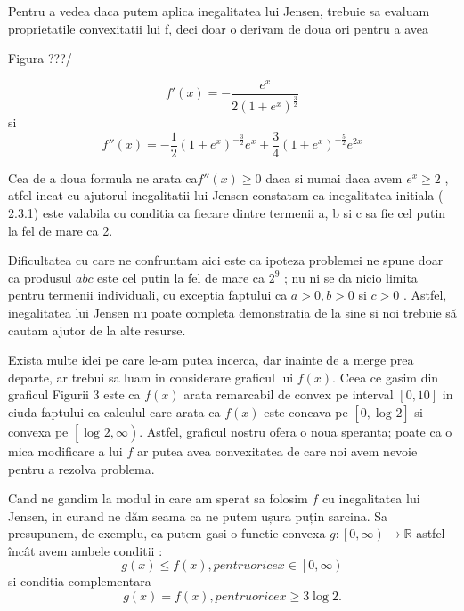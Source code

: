 \documentclass[a4paper,12pt,oneside]{report}
\begin{document}
Pentru a vedea daca putem aplica inegalitatea lui Jensen, trebuie sa evaluam proprietatile convexitatii lui f,  deci doar o derivam de doua ori pentru a avea  

Figura ???/

\begin{displaymath}
  {f}'\left ( x \right ) = -\frac{e^{x}}{2 \left ( 1 + e^{x} \right )^{\frac{3}{2}}}
\end{displaymath}
si
\begin{displaymath}
  {f}''\left ( x \right ) = -\frac{1}{2}\left (  1 + e^{x} \right )^{-\frac{3}{2}}e^{x} + \frac{3}{4}\left ( 1 + e^{x} \right )^{-\frac{5}{2}}e^{2x}
\end{displaymath}

Cea de a doua formula ne arata ca\({f}''\left ( x \right ) \geq 0\) daca si numai daca avem \(e^{x}\geq 2\) , atfel incat cu ajutorul inegalitatii lui Jensen  constatam ca inegalitatea initiala ( 2.3.1) este valabila cu conditia ca fiecare dintre termenii a, b si c sa fie cel putin la fel de mare ca 2. 

Dificultatea cu care ne confruntam aici este ca ipoteza problemei  ne spune doar  ca produsul \(abc\) este cel putin la fel de mare ca \(2^{9}\) ; nu ni se da nicio  limita pentru termenii  individuali, cu exceptia faptului ca \( a > 0, b > 0 \) si \(c > 0\) . Astfel, inegalitatea lui Jensen nu poate completa demonstratia de la sine si noi trebuie să cautam ajutor de la alte resurse. 

Exista multe idei pe care le-am putea incerca, dar inainte de a merge prea departe,  ar trebui sa luam in considerare graficul lui \(f\left ( x \right )\). Ceea ce  gasim  din graficul  Figurii 3 este ca \(f\left ( x \right ) \) arata remarcabil de convex pe interval \(\left [ 0, 10 \right ]  \) in ciuda faptului ca calculul care arata ca \(f\left ( x \right ) \) este concava pe \(\left [ 0, \log _{} 2\right ] \) si convexa pe \(\left [ \log _{} 2 , \infty \right ) \). Astfel, graficul nostru ofera o noua speranta; poate ca o mica modificare a lui \(f\) ar putea avea convexitatea de care noi avem nevoie pentru a rezolva problema.

Cand ne gandim la modul in care am sperat sa folosim \(f\) cu inegalitatea lui Jensen, in curand ne dăm seama ca ne putem ușura puțin sarcina. Sa presupunem, de exemplu, ca putem gasi o functie convexa \(g : \left [ 0 , \infty  \right ) \to \mathbb{R}\) astfel încât avem ambele conditii : 
\begin{displaymath}
  g\left ( x \right ) \leq  f\left ( x  \right ), pentru orice x \in  \left [ 0 , \infty  \right )    \label{eq:2.3.3} \tag{2.3.3} 
\end{displaymath}
si conditia complementara
\begin{displaymath}
  g \left ( x \right ) = f \left ( x \right ) , pentru orice  x\geq 3 \log 2. \label{eq:2.3.4} \tag{2.3.4}
\end{displaymath}
\end{document}
